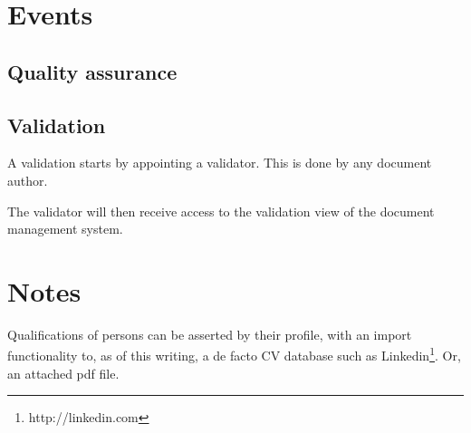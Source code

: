 \documentclass[10pt,a4paper]{article}
\begin{document}
\section{Events}
\subsection{Quality assurance}

\subsection{Validation}
A validation starts by appointing a validator. This is done by any document author.

The validator will then receive access to the validation view of the document management system.


\section{Notes}
Qualifications of persons can be asserted by their profile, with an import functionality to, as of this writing, a de facto CV database such as Linkedin\footnote{http://linkedin.com}. Or, an attached pdf file.
\end{document}
